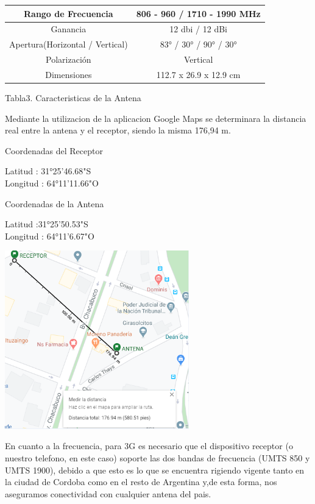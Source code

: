 \documentclass[10pt,a4paper]{article}
\begin{document}
\begin{multicols}{2}
\begin{center}
\begin{tabular}{|c|c|}
\hline 
Rango de Frecuencia  & 806 - 960 / 1710 - 1990 MHz\\ 
\hline 
Ganancia & 12 dbi / 12 dBi \\ 
\hline 
Apertura(Horizontal / Vertical) & 83° / 30° / 90° / 30° \\ 
\hline 
Polarización & Vertical \\ 
\hline 
Dimensiones & 112.7 x 26.9 x 12.9 cm \\ 
\hline 
\end{tabular} 
\end{center}

\begin{center}
Tabla3. Caracteristicas de la Antena
\end{center}
Mediante la utilizacion de la aplicacion Google Maps se determinara la distancia real entre la antena y el receptor, siendo la misma 176,94 m.
\begin{center}
 Coordenadas del Receptor 
 \end{center} 
Latitud : 31°25'46.68"S\\
Longitud : 64°11'11.66"O \\
\begin{center}
 Coordenadas de la Antena
 \end{center} 
Latitud :31°25'50.53"S\\
Longitud :  64°11'6.67"O \\
\begin{center}
\includegraphics[width=8cm]{image/Captura.PNG} 
\end{center}

En cuanto a la frecuencia, para 3G es necesario que el
dispositivo receptor (o nuestro telefono, en este caso) soporte las dos bandas de frecuencia (UMTS 850 y UMTS 1900), debido a que esto es lo que se encuentra rigiendo vigente tanto en la ciudad de Cordoba como en el resto de Argentina y,de esta forma, nos aseguramos conectividad con cualquier antena del pais.


\end{multicols}
\end{document}
